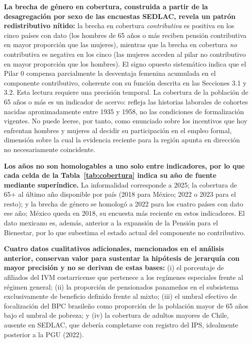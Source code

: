 \documentclass[12pt, letterpaper]{article}
\begin{document}
\textbf{La brecha de género en cobertura, construida a partir de la desagregación por sexo de las encuestas SEDLAC, revela un patrón redistributivo nítido:} la brecha en cobertura \textit{contributiva} es positiva en los cinco países con dato (los hombres de 65 años o más reciben pensión contributiva en mayor proporción que las mujeres), mientras que la brecha en cobertura \textit{no} contributiva es negativa en los cinco (las mujeres acceden al pilar no contributivo en mayor proporción que los hombres). El signo opuesto sistemático indica que el Pilar 0 compensa parcialmente la desventaja femenina acumulada en el componente contributivo, coherente con su función descrita en las Secciones 3.1 y 3.2. Esta lectura requiere
una precisión temporal. La cobertura de la población de 65 años o más es un
indicador de acervo: refleja las historias laborales de cohortes nacidas
aproximadamente entre 1935 y 1958, no las condiciones de formalización vigentes.
No puede leerse, por tanto, como enunciado sobre los incentivos que hoy enfrentan
hombres y mujeres al decidir su participación en el empleo formal, dimensión sobre
la cual la evidencia reciente para la región apunta en dirección no necesariamente
coincidente.

\textbf{Los años no son homologables a uno solo entre indicadores, por lo que cada celda de la Tabla~\ref{tab:cobertura} indica su año de fuente mediante superíndice.} La informalidad corresponde a 2025; la cobertura de 65+ al último año disponible por país (2018 para México; 2022 o 2023 para el resto); y la brecha de género se homologó a 2022 para los cuatro países con dato ese año; México queda en 2018, su encuesta más reciente en estos indicadores. El dato mexicano es, además, anterior a la expansión de la Pensión para el Bienestar, por lo que subestima el estado actual del componente no contributivo.

\textbf{Cuatro datos cualitativos adicionales, mencionados en el análisis anterior, conservan valor para sustentar la hipótesis de jerarquía con mayor precisión y no se derivan de estas bases:} (i) el porcentaje de afiliados del IVM costarricense que pertenece a los regímenes especiales frente al régimen general; (ii) la proporción de pensionados panameños en el subsistema exclusivamente de beneficio definido frente al mixto; (iii) el umbral efectivo de focalización del BPC brasileño como proporción de la población mayor de 65 años bajo el umbral de pobreza; y (iv) la cobertura de adultos mayores de Chile, ausente en SEDLAC, que debería completarse con registro del IPS, idealmente posterior a la PGU (2022).
\end{document}
